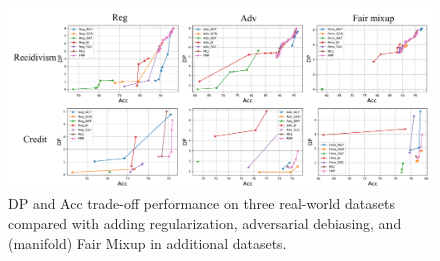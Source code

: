 \documentclass[letterpaper]{article} %
\theoremstyle{plain}
\theoremstyle{definition}
\theoremstyle{remark}
\begin{document}
\begin{figure}[ht]
\centering
\includegraphics[width=0.8\linewidth]{Tradeoff_manual.pdf}

\caption{DP and Acc trade-off performance on three real-world datasets compared with adding regularization, adversarial debiasing, and (manifold) Fair Mixup in additional datasets.}
\label{fig:tradeoff_manual}
\vspace{-5pt}
\end{figure}

\end{document}
